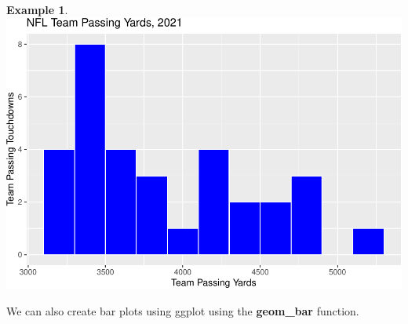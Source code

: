 \documentclass[
  11pt,
]{book}
\theoremstyle{definition}
\theoremstyle{definition}
\newtheorem{example}{Example}[chapter]
\theoremstyle{definition}
\theoremstyle{definition}
\theoremstyle{remark}
\begin{document}
\begin{example}
\includegraphics{series_files/figure-latex/hist3-1.pdf}
\end{example}

We can also create bar plots using ggplot using the \textbf{geom\_bar} function.
\end{document}
